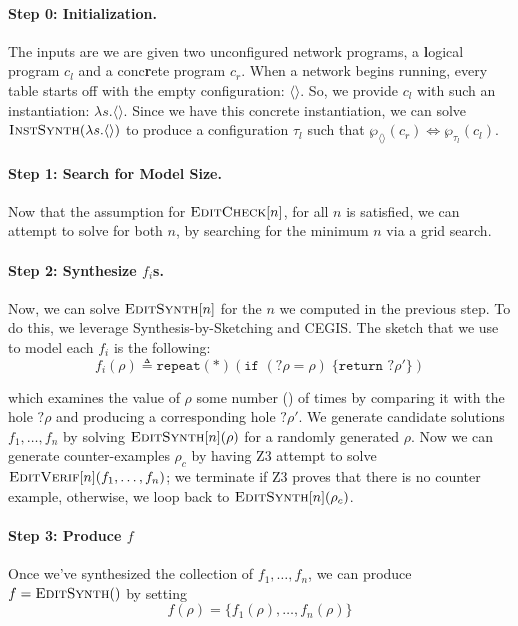\paragraph{Step 0: Initialization.} The inputs are we are given two unconfigured
network programs, a \textbf{l}ogical program $c_l$ and a conc\textbf{r}ete
program $c_r$. When a network begins running, every table starts off with the
empty configuration: $\langle\rangle$. So, we provide $c_l$ with such an
instantiation: $\lambda s. \langle \rangle$. Since we have this concrete
instantiation, we can solve $\textsc{InstSynth}(\lambda s. \langle\rangle)$ to
produce a configuration $\tau_l$ such that
$\wp_{\langle\rangle}(c_r) \Leftrightarrow \wp_{\tau_l}(c_l)$.

\paragraph{Step 1: Search for Model Size.} Now that the assumption for
$\textsc{EditCheck}[n]$, for all $n$ is satisfied, we can attempt to solve for
both $n$, by searching for the minimum $n$ via a grid search.

\paragraph{Step 2: Synthesize $f_i$s.} Now, we can solve $\textsc{EditSynth}[n]$
for the $n$ we computed in the previous step. To do this, we leverage
Synthesis-by-Sketching and CEGIS. The sketch that we use to model each $f_i$ is
the following:
\[f_i(\rho) \triangleq \texttt{repeat}(*)\left(\texttt{if }(?\rho = \rho)\;\{\texttt{return }?\rho'\}\right)\]

which examines the value of $\rho$ some number () of times by comparing it with
the hole $?\rho$ and producing a corresponding hole $?\rho'$. We generate
candidate solutions $f_1,\ldots, f_n$ by solving $\textsc{EditSynth}[n](\rho)$
for a randomly generated $\rho$. Now we can generate counter-examples $\rho_c$
by having Z3 attempt to solve $\textsc{EditVerif}[n](f_1,\ldots,f_n)$; we
terminate if Z3 proves that there is no counter example, otherwise, we loop back
to $\textsc{EditSynth}[n](\rho_c)$. 

\paragraph{Step 3: Produce $f$} Once we've synthesized the collection of
$f_1, \ldots, f_n$, we can produce $f = \textsc{EditSynth}()$ by setting
\[f(\rho) = \{f_1(\rho), \ldots, f_n(\rho)\}\]


